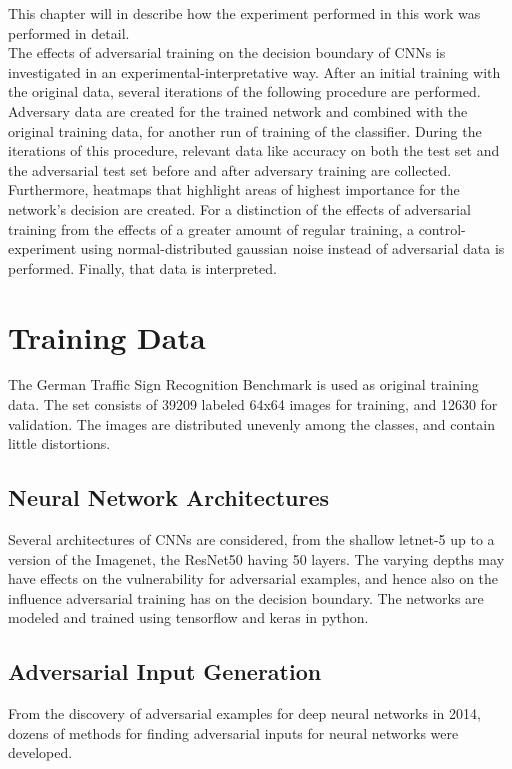 \documentclass[draft,final]{vutinfth} %
\begin{document}
This chapter will in describe how the experiment performed in this work was performed in detail. \\
The effects of adversarial training on the decision boundary of CNNs is investigated in an experimental-interpretative way.
After an initial training with the original data, several iterations of the following procedure are performed.
Adversary data are created for the trained network and combined with the original training data, for another run of training of the classifier.
During the iterations of this procedure, relevant data like accuracy on both the test set and the adversarial test set before and after adversary training are collected. 
Furthermore, heatmaps that highlight areas of highest importance for the network's decision are created.
For a distinction of the effects of adversarial training from the effects of a greater amount of regular training, a control-experiment using normal-distributed gaussian noise instead of adversarial data is performed.
Finally, that data is interpreted.

\section{Training Data}

The German Traffic Sign Recognition Benchmark is used as original training data. The set consists of 39209 labeled 64x64 images for training, and 12630 for validation. The images are distributed unevenly among the classes, and contain little distortions.

\subsection{Neural Network Architectures}

Several architectures of CNNs are considered, from the shallow letnet-5 up to a version of the Imagenet, the ResNet50 having 50 layers. The varying depths may have effects on the vulnerability for adversarial examples, and hence also on the influence adversarial training has on the decision boundary. The networks are modeled and trained using tensorflow and keras in python.

\subsection{Adversarial Input Generation}

From the discovery of adversarial examples for deep neural networks in 2014, dozens of methods for finding adversarial inputs for neural networks were developed.
\end{document}
